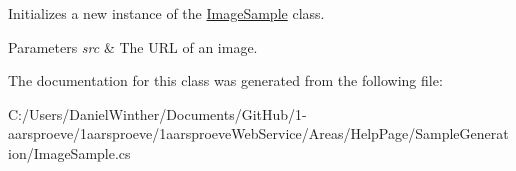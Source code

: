 Initializes a new instance of the \hyperlink{class__1aarsproeve_web_service_1_1_areas_1_1_help_page_1_1_image_sample}{Image\+Sample} class. 


\begin{DoxyParams}{Parameters}
{\em src} & The U\+R\+L of an image.\\
\hline
\end{DoxyParams}


The documentation for this class was generated from the following file\+:\begin{DoxyCompactItemize}
\item 
C\+:/\+Users/\+Daniel\+Winther/\+Documents/\+Git\+Hub/1-\/aarsproeve/1aarsproeve/1aarsproeve\+Web\+Service/\+Areas/\+Help\+Page/\+Sample\+Generation/Image\+Sample.\+cs\end{DoxyCompactItemize}
